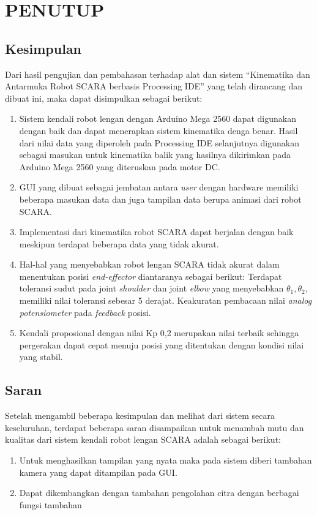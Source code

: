 
\chapter{PENUTUP}
\section{Kesimpulan}
Dari hasil pengujian dan pembahasan terhadap alat dan sistem “Kinematika dan Antarmuka Robot SCARA berbasis Processing IDE” yang telah dirancang dan dibuat ini, maka dapat disimpulkan sebagai berikut:
\begin{enumerate}
	\item Sistem kendali robot lengan dengan Arduino Mega 2560 dapat digunakan dengan baik dan dapat menerapkan sistem kinematika denga benar. Hasil dari nilai data yang diperoleh pada Processing IDE selanjutnya digunakan sebagai masukan untuk kinematika balik yang hasilnya dikirimkan pada Arduino Mega 2560 yang diteruskan pada motor DC.
	\item GUI yang dibuat sebagai jembatan antara \textit{user} dengan hardware memiliki beberapa masukan data dan juga tampilan data berupa animasi dari robot SCARA.
	\item Implementasi dari kinematika robot SCARA dapat berjalan dengan baik meskipun terdapat beberapa data yang tidak akurat. 
	\item  Hal-hal yang menyebabkan robot lengan SCARA  tidak akurat dalam menentukan posisi \textit{end-effector} diantaranya sebagai berikut:
	\subitem  Terdapat toleransi sudut pada joint \textit{shoulder} dan joint \textit{elbow} yang menyebabkan $\theta_{1}, \theta_{2}$, memiliki nilai toleransi sebesar 5 derajat. 
	\subitem  Keakuratan  pembacaan nilai \textit{analog potensiometer} pada \textit{feedback} posisi. 
	\item  Kendali proposional dengan nilai Kp 0,2 merupakan nilai terbaik sehingga pergerakan dapat cepat menuju posisi yang ditentukan dengan kondisi nilai yang stabil.
\end{enumerate}

\section{Saran}
Setelah mengambil beberapa kesimpulan dan melihat dari sistem secara keseluruhan, terdapat beberapa saran disampaikan untuk menambah mutu dan kualitas dari sistem kendali robot lengan SCARA adalah sebagai berikut: 

\begin{enumerate}
	\item Untuk menghasilkan tampilan yang nyata maka pada sistem diberi tambahan kamera yang dapat ditampilan pada GUI.
	\item Dapat dikembangkan dengan tambahan pengolahan citra dengan berbagai fungsi tambahan
\end{enumerate}
